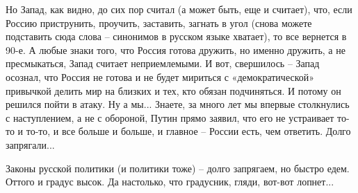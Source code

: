 Но Запад, как видно, до сих пор считал (а может быть, еще и считает), что, если
Россию приструнить, проучить, заставить, загнать в угол (снова можете
подставить сюда слова – синонимов в русском языке хватает), то все вернется в
90-е. А любые знаки того, что Россия готова дружить, но именно дружить, а не
пресмыкаться, Запад считает неприемлемыми. И вот, свершилось – Запад осознал,
что Россия не готова и не будет мириться с «демократической» привычкой делить
мир на близких и тех, кто обязан подчиняться. И потому он решился пойти в
атаку. Ну а мы... Знаете, за много лет мы впервые столкнулись с наступлением, а
не с обороной, Путин прямо заявил, что его не устраивает то-то и то-то, и все
больше и больше, и главное – России есть, чем ответить. Долго запрягали...

Законы русской политики (и политики тоже) – долго запрягаем, но быстро едем.
Оттого и градус высок. Да настолько, что градусник, гляди, вот-вот лопнет...
